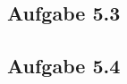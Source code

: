 \documentclass{standalone}
\begin{document}
    
\subsection{Aufgabe 5.3}


\subsection{Aufgabe 5.4}
\end{document}
